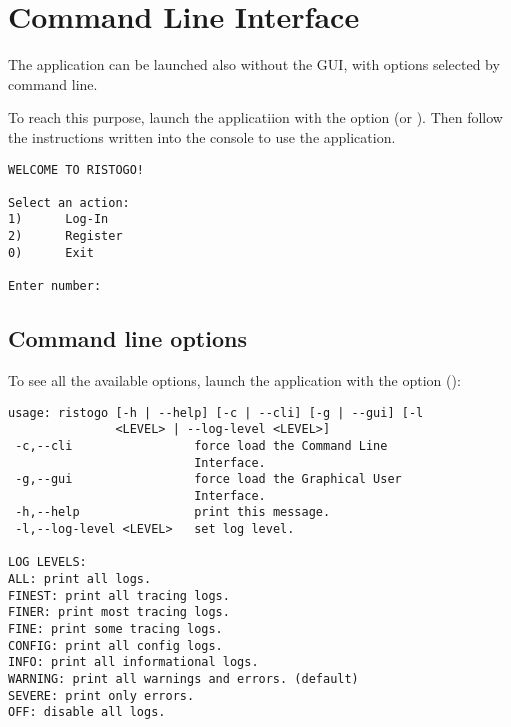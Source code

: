 \section{Command Line Interface}

The application can be launched also without the GUI, with options selected by
command line.

To reach this purpose, launch the applicatiion with the option  (or
). Then follow the instructions written into the console to use the
application.

\begin{verbatim}
WELCOME TO RISTOGO!

Select an action:
1)      Log-In
2)      Register
0)      Exit

Enter number:
\end{verbatim}

\subsection{Command line options}

To see all the available options, launch the application with the option
 ():

\begin{verbatim}
usage: ristogo [-h | --help] [-c | --cli] [-g | --gui] [-l
               <LEVEL> | --log-level <LEVEL>]
 -c,--cli                 force load the Command Line
                          Interface.
 -g,--gui                 force load the Graphical User
                          Interface.
 -h,--help                print this message.
 -l,--log-level <LEVEL>   set log level.

LOG LEVELS:
ALL: print all logs.
FINEST: print all tracing logs.
FINER: print most tracing logs.
FINE: print some tracing logs.
CONFIG: print all config logs.
INFO: print all informational logs.
WARNING: print all warnings and errors. (default)
SEVERE: print only errors.
OFF: disable all logs.
\end{verbatim}

